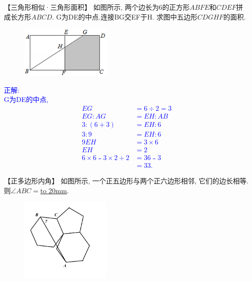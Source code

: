 \item {
    【三角形相似·三角形面积】
    如图所示, 两个边长为6的正方形$ABFE$和$CDEF$拼成长方形$ABCD$. G为DE的中点.连接BG交EF于H. 求图中五边形$CDGHF$的面积.
    \begin{figure}[H] 
        \centering
        \includegraphics[width=0.4\textwidth]{./pics/Chapter_2/13.png}
    \end{figure}
    \ifshowSolution 
        \fangsong{}\textcolor{blue}{
            正解: \\
            G为DE的中点,\\
            \begin{align*}
                EG&=6\div2=3 \\
                EG:AG&=EH:AB \\
                3:(6+3)&=EH:6 \\
                3:9&=EH:6 \\
                9EH&=3\times6 \\
                EH&=2 \\
                6\times6﹣3\times2\div2 &=36﹣3 \\
                &=33.
            \end{align*}
        }
    \else
        \vspace{1cm}
    \fi
}

\item {
    【正多边形内角】
    {如图所示, 一个正五边形与两个正六边形相邻, 它们的边长相等. 则$\angle ABC = $\underline{\hbox to 20mm{}}.} 
    \begin{figure}[H] 
        \centering
        \includegraphics[width=0.4\textwidth]{./pics/Chapter_2/7.png}
    \end{figure}
    \vspace{1cm}
}

